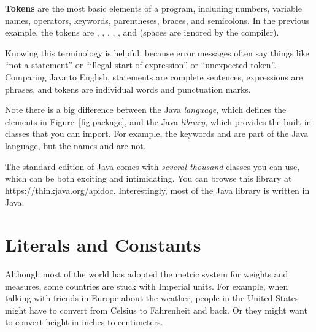 {\bf Tokens} are the most basic elements of a program, including numbers, variable names, operators, keywords, parentheses, braces, and semicolons.
In the previous example, the tokens are , \java{=}, , \java{/}, , and \java{;} (spaces are ignored by the compiler).


Knowing this terminology is helpful, because error messages often say things like ``not a statement'' or ``illegal start of expression'' or ``unexpected token''.
Comparing Java to English, statements are complete sentences, expressions are phrases, and tokens are individual words and punctuation marks.

Note there is a big difference between the Java {\em language}, which defines the elements in Figure~\ref{fig.package}, and the Java {\em library}, which provides the built-in classes that you can import.
For example, the keywords  and  are part of the Java language, but the names  and  are not.

The standard edition of Java comes with {\em several thousand} classes you can use, which can be both exciting and intimidating.
You can browse this library at \url{https://thinkjava.org/apidoc}.
Interestingly, most of the Java library is written in Java.


\section{Literals and Constants}

Although most of the world has adopted the metric system for weights and measures, some countries are stuck with Imperial units.
For example, when talking with friends in Europe about the weather, people in the United States might have to convert from Celsius to Fahrenheit and back.
Or they might want to convert height in inches to centimeters.



